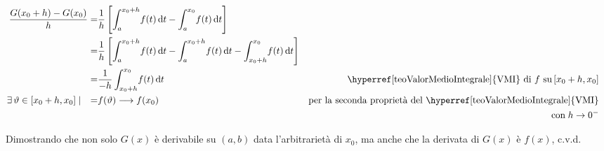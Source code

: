 \documentclass[../../dimostrazioni]{subfiles}
\begin{document}
                            \begin{align*}
                                \frac{G(x_0+h) - G(x_0)}{h} =& \frac{1}{h} \left[ \int_a^{x_0+h} \! f(t) \, \mathrm{d}t - \int_a^{x_0} \! f(t) \, \mathrm{d}t \right] \\
                                                            =& \frac{1}{h} \left[ \int_a^{x_0+h} \! f(t) \, \mathrm{d}t - \int_a^{x_0+h} \! f(t) \, \mathrm{d}t - \int_{x_0+h}^{x_0} \! f(t) \, \mathrm{d}t \right] \\
                                                            =& \frac{1}{-h} \int_{x_0+h}^{x_0} \! f(t) \, \mathrm{d}t & \text{\hyperref[teoValorMedioIntegrale]{VMI} di \(f\) su} \, [x_0 + h, x_0]\\
                                \exists \, \vartheta \in [x_0+h, x_0] \mid \quad =& f(\vartheta) \longrightarrow f(x_0)          & \text{per la seconda proprietà del \hyperref[teoValorMedioIntegrale]{VMI}}& \\
                                &                            &  \text{con} \; h \rightarrow 0^-&
                            \end{align*}
                            
                            Dimostrando che non solo \(G(x)\) è derivabile su \((a,b)\) data l'arbitrarietà di \(x_0\), 
                            ma anche che la derivata di \(G(x)\) è \(f(x)\), c.v.d.          
\end{document}
